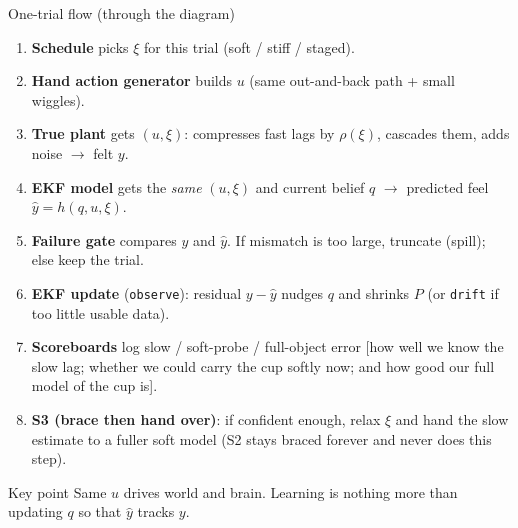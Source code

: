 \documentclass[aspectratio=169, 11pt]{beamer}
\begin{document}
\begin{frame}{One-trial flow (through the diagram)}
\small
\begin{enumerate}
  \item[\textbf{1.}] \textbf{Schedule} picks $\xi$ for this trial
        (soft / stiff / staged).
  \item[\textbf{2.}] \textbf{Hand action generator} builds
        $u$ (same out-and-back path + small wiggles).
  \item[\textbf{3.}] \textbf{True plant} gets $(u,\xi)$:
        compresses fast lags by $\rho(\xi)$, cascades them,
        adds noise $\to$ felt $y$.
  \item[\textbf{4.}] \textbf{EKF model} gets the \emph{same} $(u,\xi)$
        and current belief $q$ $\to$ predicted feel $\hat y=h(q,u,\xi)$.
  \item[\textbf{5.}] \textbf{Failure gate} compares $y$ and $\hat y$.
        If mismatch is too large, truncate (spill); else keep the trial.
  \item[\textbf{6.}] \textbf{EKF update} (\texttt{observe}): residual
        $y-\hat y$ nudges $q$ and shrinks $P$
        (or \texttt{drift} if too little usable data).
  \item[\textbf{7.}] \textbf{Scoreboards} log slow / soft-probe / full-object error
        [how well we know the slow lag; whether we could carry the cup softly
        now; and how good our full model of the cup is].
  \item[\textbf{8.}] \textbf{S3 (brace then hand over)}: if confident enough,
        relax $\xi$ and hand the slow estimate to a fuller soft model
        (S2 stays braced forever and never does this step).
\end{enumerate}
\vspace{4pt}
\begin{block}{Key point}
Same $u$ drives world and brain. Learning is nothing more than updating $q$
so that $\hat y$ tracks $y$.
\end{block}
\end{frame}
\end{document}
